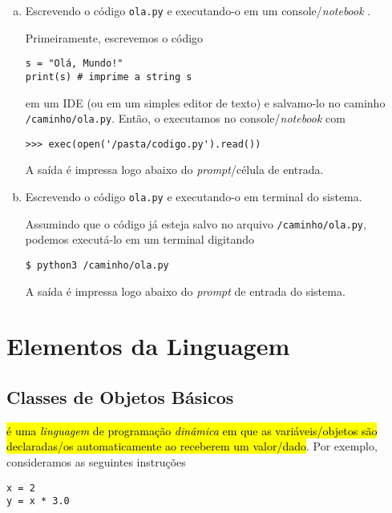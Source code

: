 \documentclass[12pt]{article}
\begin{document}
\begin{ex}
\begin{enumerate}[a)]
  \item Escrevendo o código \verb+ola.py+ e executando-o em um console/\textit{notebook} {\python}.
  
  Primeiramente, escrevemos o código

\begin{lstlisting}
s = "Olá, Mundo!"
print(s) # imprime a string s
\end{lstlisting}

em um IDE (ou em um simples editor de texto) e salvamo-lo no caminho \texttt{/caminho/ola.py}. Então, o executamos no console/\textit{notebook} {\python} com

\begin{lstlisting}
>>> exec(open('/pasta/codigo.py').read())
\end{lstlisting}

A saída é impressa logo abaixo do \textit{prompt}/célula de entrada.
  
  \item Escrevendo o código \verb+ola.py+ e executando-o em terminal do sistema.
  
  Assumindo que o código já esteja salvo no arquivo \texttt{/caminho/ola.py}, podemos executá-lo em um terminal digitando

\begin{lstlisting}
$ python3 /caminho/ola.py
\end{lstlisting}

  A saída é impressa logo abaixo do \textit{prompt} de entrada do sistema.
\end{enumerate}

\end{ex}

\section{Elementos da Linguagem}\label{sec_elem}

\subsection{Classes de Objetos Básicos}

\hl{{\python} é uma \emph{linguagem} de programação \emph{dinâmica} em que as variáveis/objetos são declaradas/os automaticamente ao receberem um valor/dado}. Por exemplo, consideramos as seguintes instruções

\begin{lstlisting}
x = 2
y = x * 3.0
\end{lstlisting}
\end{document}
